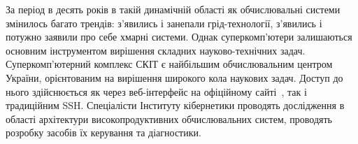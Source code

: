 За період в десять років в такій динамічній області як обчислювальні системи змінилось багато трендів: з’явились і занепали грід-технології, з’явились і потужно заявили про себе хмарні системи. Однак суперкомп’ютери залишаються  основним  інструментом вирішення складних науково-технічних задач. 
Суперкомп’ютерний комплекс СКІТ є найбільшим обчислювальним центром України, орієнтованим на вирішення широкого кола наукових задач. Доступ до нього здійснюється як через веб-інтерфейс на офіційному сайті~\cite{ic}, так і традиційним SSH. Спеціалісти Інституту кібернетики проводять дослідження в області архітектури високопродуктивних обчислювальних систем, проводять розробку засобів їх керування та діагностики. 
